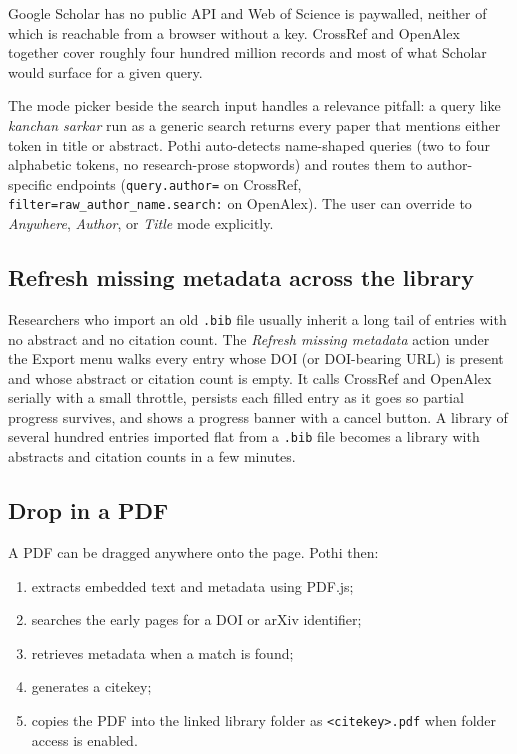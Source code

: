 \documentclass[10pt,twocolumn]{article}
\begin{document}
Google Scholar has no public API and Web of Science is paywalled, neither of which is reachable from a browser without a key. CrossRef and OpenAlex together cover roughly four hundred million records and most of what Scholar would surface for a given query.

The mode picker beside the search input handles a relevance pitfall: a query like \emph{kanchan sarkar} run as a generic search returns every paper that mentions either token in title or abstract. Pothi auto-detects name-shaped queries (two to four alphabetic tokens, no research-prose stopwords) and routes them to author-specific endpoints (\texttt{query.author=} on CrossRef, \texttt{filter=raw\_author\_name.search:} on OpenAlex). The user can override to \emph{Anywhere}, \emph{Author}, or \emph{Title} mode explicitly.

\subsection{Refresh missing metadata across the library}

Researchers who import an old \texttt{.bib} file usually inherit a long tail of entries with no abstract and no citation count. The \emph{Refresh missing metadata} action under the Export menu walks every entry whose DOI (or DOI-bearing URL) is present and whose abstract or citation count is empty. It calls CrossRef and OpenAlex serially with a small throttle, persists each filled entry as it goes so partial progress survives, and shows a progress banner with a cancel button. A library of several hundred entries imported flat from a \texttt{.bib} file becomes a library with abstracts and citation counts in a few minutes.

\subsection{Drop in a PDF}

A PDF can be dragged anywhere onto the page. Pothi then:

\begin{enumerate}
\item extracts embedded text and metadata using PDF.js;
\item searches the early pages for a DOI or arXiv identifier;
\item retrieves metadata when a match is found;
\item generates a citekey;
\item copies the PDF into the linked library folder as \texttt{<citekey>.pdf}
      when folder access is enabled.
\end{enumerate}
\end{document}
